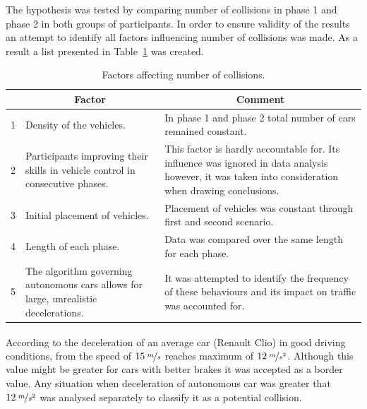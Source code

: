 \documentclass[11pt,english]{article}
\begin{document}
The hypothesis was tested by comparing number of collisions in phase 1 and phase 2 in both groups of participants. In order to ensure validity of the results an attempt to identify all factors influencing number of collisions was made. As a result a list presented in Table~\ref{table:hypothesis1} was created.


\begin{table}[]
\centering
\begin{tabular}{|c|p{6.2cm}|p{6.2cm}|}
\hline
\textbf{} & \multicolumn{1}{c|}{\textbf{Factor}}                                                 & \multicolumn{1}{c|}{\textbf{Comment}}                                                                                                                \\ \hline
1         & Density of the vehicles.                                                             & In phase 1 and phase 2 total number of cars remained constant.                                                                                       \\ \hline
2         & Participants improving their skills in vehicle control in consecutive phases.        & This factor is hardly accountable for. Its influence was ignored in data analysis however, it was taken into consideration when drawing conclusions. \\ \hline
3         & Initial placement of vehicles.                                                       & Placement of vehicles was constant through first and second scenario.                                                                                \\ \hline
4         & Length of each phase.                                                                & Data was compared over the same length for each phase.                                                                                               \\ \hline
5         & The algorithm governing autonomous cars allows for large, unrealistic decelerations. & It was attempted to identify the frequency of these behaviours and its impact on traffic was accounted for.                                          \\ \hline
\end{tabular}
\caption{Factors affecting number of collisions.}
\label{table:hypothesis1}
\end{table}



According to \citet{vangi2007evaluation} the deceleration of an average car (Renault Clio\textsuperscript{\textregistered}) in good driving conditions, from the speed of $15\:\nicefrac{m}{s}$ reaches maximum of $12\:\nicefrac{m}{s^2}$. Although this value might be greater for cars with better brakes it was accepted as a border value. Any situation when deceleration of autonomous car was greater that $12\:\nicefrac{m}{s^2}$ was analysed separately to classify it as a potential collision. 
\end{document}
